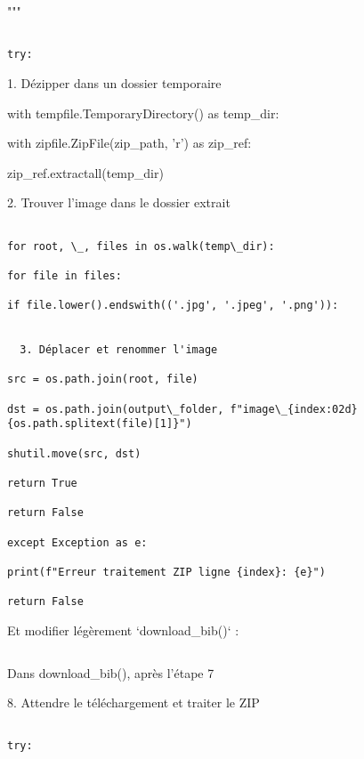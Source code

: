 """

\begin{verbatim}

try:

\end{verbatim}

  1. Dézipper dans un dossier temporaire

with tempfile.TemporaryDirectory() as temp\_dir:

with zipfile.ZipFile(zip\_path, 'r') as zip\_ref:

zip\_ref.extractall(temp\_dir)

  2. Trouver l'image dans le dossier extrait

\begin{verbatim}

for root, \_, files in os.walk(temp\_dir):

for file in files:

if file.lower().endswith(('.jpg', '.jpeg', '.png')):


  3. Déplacer et renommer l'image

src = os.path.join(root, file)

dst = os.path.join(output\_folder, f"image\_{index:02d}{os.path.splitext(file)[1]}")

shutil.move(src, dst)

return True

return False

except Exception as e:

print(f"Erreur traitement ZIP ligne {index}: {e}")

return False

\end{verbatim}

Et modifier légèrement `download\_bib()` :

\begin{verbatim}

\end{verbatim}

  Dans download\_bib(), après l'étape 7

  8. Attendre le téléchargement et traiter le ZIP

\begin{verbatim}

try:

\end{verbatim}

